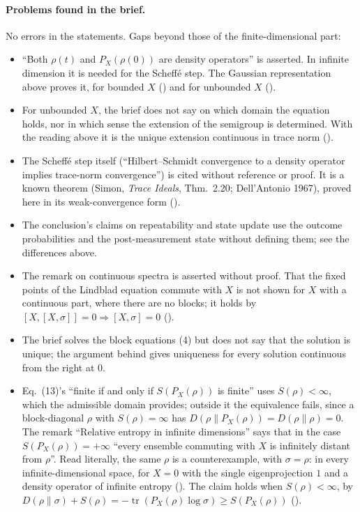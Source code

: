 \documentclass[11pt]{article}
\begin{document}
\paragraph{Problems found in the brief.} No errors in the statements. Gaps beyond those of the
finite-dimensional part:
\begin{itemize}
\item ``Both $\rho(t)$ and $P_X(\rho(0))$ are density operators'' is asserted. In infinite
  dimension it is needed for the Scheff\'e step. The Gaussian representation above proves it,
  for bounded $X$ () and for
  unbounded $X$ ().
\item For unbounded $X$, the brief does not say on which domain the equation holds, nor in which
  sense the extension of the semigroup is determined. With the reading above it is the unique
  extension continuous in trace norm ().
\item The Scheff\'e step itself (``Hilbert--Schmidt convergence to a density operator implies
  trace-norm convergence'') is cited without reference or proof. It is a known theorem (Simon,
  \emph{Trace Ideals}, Thm.~2.20; Dell'Antonio 1967), proved here in its weak-convergence form
  ().
\item The conclusion's claims on repeatability and state update use the outcome probabilities and
  the post-measurement state without defining them; see the differences above.
\item The remark on continuous spectra is asserted without proof. That the fixed points of the
  Lindblad equation commute with $X$ is not shown for $X$ with a continuous part, where there are
  no blocks; it holds by $[X, [X, \sigma]] = 0 \Rightarrow [X, \sigma] = 0$
  ().
\item The brief solves the block equations (4) but does not say that the solution is unique; the
  argument behind  gives uniqueness for every
  solution continuous from the right at $0$.
\item Eq.~(13)'s ``finite if and only if $S(P_X(\rho))$ is finite'' uses $S(\rho) < \infty$,
  which the admissible domain provides; outside it the equivalence fails, since a block-diagonal
  $\rho$ with $S(\rho) = \infty$ has $D(\rho\|P_X(\rho)) = D(\rho\|\rho) = 0$. The remark
  ``Relative entropy in infinite dimensions'' says that in the case $S(P_X(\rho)) = +\infty$
  ``every ensemble commuting with $X$ is infinitely distant from $\rho$''. Read literally, the same
  $\rho$ is a counterexample, with $\sigma = \rho$: in every infinite-dimensional space, for
  $X = 0$ with the single eigenprojection $1$ and a density operator of infinite entropy
  (). The claim holds when $S(\rho) < \infty$, by
  $D(\rho\|\sigma) + S(\rho) = -\operatorname{tr}(P_X(\rho)\log\sigma) \ge S(P_X(\rho))$
  ().
\end{itemize}
\end{document}
